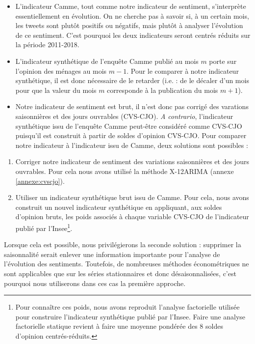 \documentclass[11pt,french,french]{article}
\let\rmarkdownfootnote\footnote%
\def\footnote{\protect\rmarkdownfootnote}
\begin{document}
\begin{itemize}
\item
  L'indicateur Camme, tout comme notre indicateur de sentiment,
  s'interprète essentiellement en évolution. On ne cherche pas à savoir
  si, à un certain mois, les tweets sont plutôt positifs ou négatifs,
  mais plutôt à analyser l'évolution de ce sentiment. C'est pourquoi les
  deux indicateurs seront centrés réduits sur la période 2011-2018.
\item
  L'indicateur synthétique de l'enquête Camme publié au mois \(m\) porte
  sur l'opinion des ménages au mois \(m-1\). Pour le comparer à notre
  indicateur synthétique, il est donc nécessaire de le retarder (i.e. :
  de le décaler d'un mois pour que la valeur du mois \(m\) corresponde à
  la publication du mois \(m+1\)).
\item
  Notre indicateur de sentiment est brut, il n'est donc pas corrigé des
  varations saisonnières et des jours ouvrables (CVS-CJO). \emph{A
  contrario}, l'indicateur synthétique issu de l'enquête Camme peut-être
  considéré comme CVS-CJO puisqu'il est construit à partir de soldes
  d'opinion CVS-CJO. Pour comparer notre indicateur à l'indicateur issu
  de Camme, deux solutions sont possibles :
\end{itemize}

\begin{enumerate}
\def\labelenumi{\arabic{enumi}.}
\item
  Corriger notre indicateur de sentiment des variations saisonnières et
  des jours ouvrables. Pour cela nous avons utilisé la méthode X-12ARIMA
  (annexe \ref{annexe:cvscjo}).
\item
  Utiliser un indicateur synthétique brut issu de Camme. Pour cela, nous
  avons construit un nouvel indicateur synthétique en appliquant, aux
  soldes d'opinion bruts, les poids associés à chaque variable CVS-CJO
  de l'indicateur publié par l'Insee\footnote{Pour connaître ces poids,
    nous avons reproduit l'analyse factorielle utilisée pour construire
    l'indicateur synthétique publié par l'Insee. Faire une analyse
    factorielle statique revient à faire une moyenne pondérée des 8
    soldes d'opinion centrés-réduits.}.
\end{enumerate}

Lorsque cela est possible, nous privilégierons la seconde solution :
supprimer la saisonnalité serait enlever une information importante pour
l'analyse de l'évolution des sentiments. Toutefois, de nombreuses
méthodes économétriques ne sont applicables que sur les séries
stationnaires et donc désaisonnalisées, c'est pourquoi nous utiliserons
dans ces cas la première approche.
\end{document}
